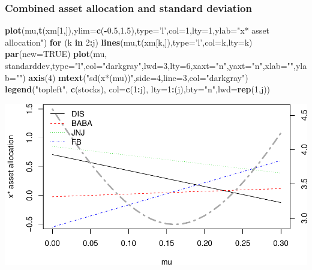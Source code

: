 \documentclass[]{article}
\newenvironment{Shaded}{\begin{snugshade}}{\end{snugshade}}
\newcommand{\KeywordTok}[1]{\textcolor[rgb]{0.13,0.29,0.53}{\textbf{#1}}}
\newcommand{\DataTypeTok}[1]{\textcolor[rgb]{0.13,0.29,0.53}{#1}}
\newcommand{\DecValTok}[1]{\textcolor[rgb]{0.00,0.00,0.81}{#1}}
\newcommand{\FloatTok}[1]{\textcolor[rgb]{0.00,0.00,0.81}{#1}}
\newcommand{\StringTok}[1]{\textcolor[rgb]{0.31,0.60,0.02}{#1}}
\newcommand{\OtherTok}[1]{\textcolor[rgb]{0.56,0.35,0.01}{#1}}
\newcommand{\ControlFlowTok}[1]{\textcolor[rgb]{0.13,0.29,0.53}{\textbf{#1}}}
\newcommand{\OperatorTok}[1]{\textcolor[rgb]{0.81,0.36,0.00}{\textbf{#1}}}
\newcommand{\NormalTok}[1]{#1}
\begin{document}
\subsubsection{Combined asset allocation and standard
deviation}\label{combined-asset-allocation-and-standard-deviation}

\begin{Shaded}
\begin{Highlighting}[]
\KeywordTok{plot}\NormalTok{(mu,}\KeywordTok{t}\NormalTok{(xm[}\DecValTok{1}\NormalTok{,]),}\DataTypeTok{ylim=}\KeywordTok{c}\NormalTok{(}\OperatorTok{-}\FloatTok{0.5}\NormalTok{,}\FloatTok{1.5}\NormalTok{),}\DataTypeTok{type=}\StringTok{'l'}\NormalTok{,}\DataTypeTok{col=}\DecValTok{1}\NormalTok{,}\DataTypeTok{lty=}\DecValTok{1}\NormalTok{,}\DataTypeTok{ylab=}\StringTok{"x* asset allocation"}\NormalTok{)}
\ControlFlowTok{for}\NormalTok{ (k }\ControlFlowTok{in} \DecValTok{2}\OperatorTok{:}\NormalTok{j) }\KeywordTok{lines}\NormalTok{(mu,}\KeywordTok{t}\NormalTok{(xm[k,]),}\DataTypeTok{type=}\StringTok{'l'}\NormalTok{,}\DataTypeTok{col=}\NormalTok{k,}\DataTypeTok{lty=}\NormalTok{k)}
\KeywordTok{par}\NormalTok{(}\DataTypeTok{new=}\OtherTok{TRUE}\NormalTok{)}
\KeywordTok{plot}\NormalTok{(mu, standarddev,}\DataTypeTok{type=}\StringTok{"l"}\NormalTok{,}\DataTypeTok{col=}\StringTok{"darkgray"}\NormalTok{,}\DataTypeTok{lwd=}\DecValTok{3}\NormalTok{,}\DataTypeTok{lty=}\DecValTok{6}\NormalTok{,}\DataTypeTok{xaxt=}\StringTok{"n"}\NormalTok{,}\DataTypeTok{yaxt=}\StringTok{"n"}\NormalTok{,}\DataTypeTok{xlab=}\StringTok{""}\NormalTok{,}\DataTypeTok{ylab=}\StringTok{""}\NormalTok{)}
\KeywordTok{axis}\NormalTok{(}\DecValTok{4}\NormalTok{)}
\KeywordTok{mtext}\NormalTok{(}\StringTok{"sd(x*(mu))"}\NormalTok{,}\DataTypeTok{side=}\DecValTok{4}\NormalTok{,}\DataTypeTok{line=}\DecValTok{3}\NormalTok{,}\DataTypeTok{col=}\StringTok{"darkgray"}\NormalTok{)}
\KeywordTok{legend}\NormalTok{(}\StringTok{"topleft"}\NormalTok{, }\KeywordTok{c}\NormalTok{(stocks), }\DataTypeTok{col=}\KeywordTok{c}\NormalTok{(}\DecValTok{1}\OperatorTok{:}\NormalTok{j), }\DataTypeTok{lty=}\DecValTok{1}\OperatorTok{:}\NormalTok{(j),}\DataTypeTok{bty=}\StringTok{"n"}\NormalTok{,}\DataTypeTok{lwd=}\KeywordTok{rep}\NormalTok{(}\DecValTok{1}\NormalTok{,j))}
\end{Highlighting}
\end{Shaded}

\includegraphics{Markowitz_Research_Me_files/figure-latex/unnamed-chunk-18-1.pdf}
\end{document}
